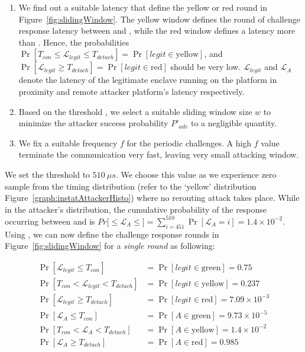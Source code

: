 \begin{enumerate}
  \item We find out a suitable latency \detach that define the yellow or red round in Figure~\ref{fig:slidingWindow}. The yellow window defines the round of challenge response latency between \connect and \detach, while the red window defines a latency more than \detach. Hence, the probabilities $\Pr[T_{con}\leq \mathcal{L}_{legit}\leq T_{detach}]=\Pr[legit\in\text{yellow}]$, and $\Pr[\mathcal{L}_{legit} \geq T_{detach}]=\Pr[legit\in\text{red}]$ should be very low. $\mathcal{L}_{legit}$ and $\mathcal{L}_{A}$ denote the latency of the legitimate enclave running on the platform in proximity and remote attacker platform's latency respectively.
  \item Based on the threshold \detach, we select a suitable sliding window size $w$ to minimize the attacker success probability $P'_{adv}$ to a negligible quantity.
  \item We fix a suitable frequency $f$ for the periodic challenges. A high $f$ value terminate the communication very fast, leaving very small attacking window.
\end{enumerate}

 We set the threshold \detach to $510\ \mu s$. We choose this value as we experience zero sample from the timing distribution (refer to the `yellow' distribution Figure~\ref{graph:instatAttackerHisto}) where no rerouting attack takes place. While in the attacker's distribution, the cumulative probability of the response occurring between \connect and \detach is $Pr[$\connect$\leq \mathcal{L}_{A} \leq$\detach$]=\sum_{i=451}^{510}\Pr[\mathcal{L}_{A}=i]=1.4\times10^{-2}$. 
Using \detach, we can now define the challenge response rounds in Figure~\ref{fig:slidingWindow} for a \emph{single round} as following:

\begin{align*}
\Pr[\mathcal{L}_{legit}\leq T_{con}]&=\Pr[legit\in\text{green}]=0.75\\
\Pr[T_{con}< \mathcal{L}_{legit}< T_{detach}]&=\Pr[legit\in\text{yellow}]= 0.237\\
\Pr[\mathcal{L}_{legit}\geq T_{detach}]&=\Pr[legit\in\text{red}]= 7.09\times10^{-3}\\
\Pr[\mathcal{L}_{A}\leq T_{con}]&=\Pr[A\in\text{green}]=9.73\times10^{-5}\\
\Pr[T_{con}< \mathcal{L}_{A}< T_{detach}]&=\Pr[A\in\text{yellow}]= 1.4\times10^{-2}\\
\Pr[\mathcal{L}_{A}\geq T_{detach}]&=\Pr[A\in\text{red}]= 0.985\\
\end{align*} 


